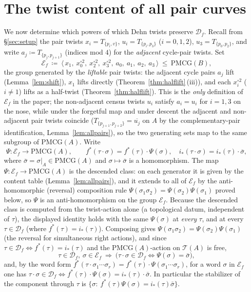 \documentclass[11pt]{article}
\newcommand{\Ef}{\mathcal E_f}
\theoremstyle{definition}
\theoremstyle{remark}
\newcommand{\Teich}{\mathcal T}
\newcommand{\PMCG}{\mathrm{PMCG}}
\newcommand{\Df}{\mathcal D_f}
\begin{document}
\section{The twist content of all pair curves}\label{sec:content}

We now determine which powers of which Dehn twists preserve $\Df$.
Recall from \S\ref{sec:setup} the pair twists $x_i=T_{\{p_i,v\}}$,
$u_i=T_{\{p_i,p_3\}}$ ($i=0,1,2$), $u_3=T_{\{p_0,p_2\}}$, and write
$a_j\coloneqq T_{\{p_j,p_{j+1}\}}$ \textup{(}indices mod $4$\textup{)}
for the \emph{adjacent} cycle-pair twists.  Set
\[
\Ef\ \coloneqq\
\bigl\langle\,x_1,\ x_0^{\circ2},\ x_2^{\circ2},\ x_3^{\circ2},\
a_0,\ a_1,\ a_2,\ a_3\,\bigr\rangle\ \le\ \PMCG(B),
\]
the group generated by the \emph{liftable} pair twists: the adjacent
cycle pairs $a_j$ lift (Lemma~\ref{lem:shift}), $x_1$ lifts directly
(Theorem~\ref{thm:halflift}\,\textup{(}iii\textup{)}), and each
$x_i^{\circ2}$ ($i\neq1$) lifts as a half-twist
(Theorem~\ref{thm:halflift}).  This is the \emph{only} definition of
$\Ef$ in the paper; the non-adjacent census twists $u_i$ satisfy
$a_i=u_i$ for $i=1,3$ on the nose, while under the forgetful map and
under descent the adjacent and non-adjacent pair twists coincide
($T_{\{p_{j+1},p_{j+2}\}}=\overline{u_j}$ on $A$ by the
complementary-pair identification, Lemma~\ref{lem:allpairs}), so the
two generating sets map to the same subgroup of $\PMCG(A)$.  Write
\[
\Psi:\Ef\longrightarrow\PMCG(A),\qquad
f^*(\tau\cdot\sigma)=f^*(\tau)\cdot\Psi(\sigma),\quad
i_*(\tau\cdot\sigma)=i_*(\tau)\cdot\bar\sigma,
\]
where $\bar\sigma=\sigma|_A\in\PMCG(A)$ and
$\sigma\mapsto\bar\sigma$ is a homomorphism.  The map
$\Psi:\Ef\to\PMCG(A)$ is the descended class: on each generator it is
given by the content table \textup{(}Lemma~\ref{lem:allpairs}\textup{)},
and it extends to all of $\Ef$ by the anti-homomorphic
\textup{(}reversal\textup{)} composition rule
$\Psi(\sigma_1\sigma_2)=\Psi(\sigma_2)\Psi(\sigma_1)$ proved below, so
$\Psi$ is an anti-homomorphism on the group $\Ef$.  Because the descended
class is computed from
the twist-action alone \textup{(}a topological datum, independent of
$\tau$\textup{)}, the displayed identity holds with the same
$\Psi(\sigma)$ at \emph{every} $\tau$, and at every $\tau\in\Df$
\textup{(}where $f^*(\tau)=i_*(\tau)$\textup{)}.  Composing
gives $\Psi(\sigma_1\sigma_2)=\Psi(\sigma_2)\Psi(\sigma_1)$
\textup{(}the reversal for simultaneous right actions\textup{)}, and
since $\tau\in\Df\iff f^*(\tau)=i_*(\tau)$ and the
$\PMCG(A)$-action on $\Teich(A)$ is free,
\begin{equation}\label{eq:compcrit}
\tau\in\Df,\ \sigma\in\Ef
\ \Longrightarrow\
\bigl(\tau\cdot\sigma\in\Df\iff\Psi(\sigma)=\bar\sigma\bigr),
\end{equation}
and, by the word form
$f^*(\tau\cdot\sigma_1\cdots\sigma_r)
=f^*(\tau)\cdot\Psi(\sigma_1\cdots\sigma_r)$, for a word $\sigma$
in $\Ef$ one has $\tau\cdot\sigma\in\Df\iff f^*(\tau)\cdot\Psi(\sigma)
=i_*(\tau)\cdot\bar\sigma$.  In particular the stabilizer of the
component through $\tau$ is
$\{\sigma:\ f^*(\tau)\Psi(\sigma)=i_*(\tau)\bar\sigma\}$.
\end{document}
